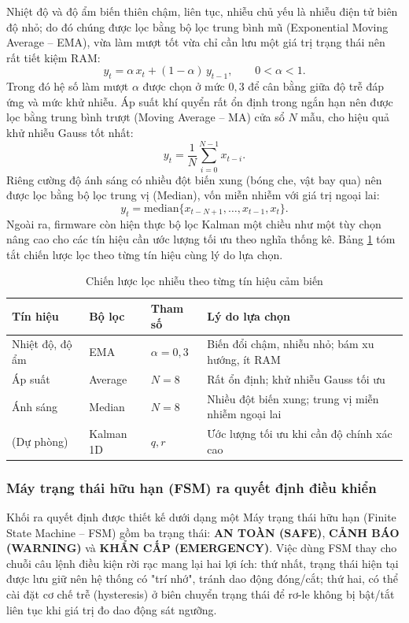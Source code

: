Nhiệt độ và độ ẩm biến thiên chậm, liên tục, nhiễu chủ yếu là nhiễu điện tử biên độ nhỏ; do đó chúng được lọc bằng bộ lọc trung bình mũ (Exponential Moving Average -- EMA), vừa làm mượt tốt vừa chỉ cần lưu một giá trị trạng thái nên rất tiết kiệm RAM:
\begin{equation}
    {y_t = \alpha \, x_t + (1-\alpha)\, y_{t-1}, \qquad 0 < \alpha < 1}.
\end{equation}
Trong đó hệ số làm mượt $\alpha$ được chọn ở mức $0{,}3$ để cân bằng giữa độ trễ đáp ứng và mức khử nhiễu. Áp suất khí quyển rất ổn định trong ngắn hạn nên được lọc bằng trung bình trượt (Moving Average -- MA) cửa sổ $N$ mẫu, cho hiệu quả khử nhiễu Gauss tốt nhất:
\begin{equation}
    {y_t = \frac{1}{N}\sum_{i=0}^{N-1} x_{t-i}}.
\end{equation}
Riêng cường độ ánh sáng có nhiều đột biến xung (bóng che, vật bay qua) nên được lọc bằng bộ lọc trung vị (Median), vốn miễn nhiễm với giá trị ngoại lai:
\begin{equation}
    {y_t = \mathrm{median}\{x_{t-N+1}, \dots, x_{t-1}, x_t\}}.
\end{equation}
Ngoài ra, firmware còn hiện thực bộ lọc Kalman một chiều \cite{kalman1960new} như một tùy chọn nâng cao cho các tín hiệu cần ước lượng tối ưu theo nghĩa thống kê. Bảng \ref{Bảng 3.5} tóm tắt chiến lược lọc theo từng tín hiệu cùng lý do lựa chọn.

\begin{table}[H]
\centering
\caption{Chiến lược lọc nhiễu theo từng tín hiệu cảm biến}
\label{Bảng 3.5}
\renewcommand{\arraystretch}{1.4}
\begin{tabular}{p{2.9cm} p{2.7cm} p{2.0cm} p{6.9cm}}
\hline
\textbf{Tín hiệu} & \textbf{Bộ lọc} & \textbf{Tham số} & \textbf{Lý do lựa chọn} \\ \hline
Nhiệt độ, độ ẩm & EMA & $\alpha = 0{,}3$ & Biến đổi chậm, nhiễu nhỏ; bám xu hướng, ít RAM \\ 
Áp suất & Average & $N = 8$ & Rất ổn định; khử nhiễu Gauss tối ưu \\ 
Ánh sáng & Median & $N = 8$ & Nhiều đột biến xung; trung vị miễn nhiễm ngoại lai \\ 
(Dự phòng) & Kalman 1D & $q, r$ & Ước lượng tối ưu khi cần độ chính xác cao \\ \hline
\end{tabular}
\end{table}

\subsubsection{Máy trạng thái hữu hạn (FSM) ra quyết định điều khiển}
Khối ra quyết định được thiết kế dưới dạng một Máy trạng thái hữu hạn (Finite State Machine -- FSM) gồm ba trạng thái: \textbf{AN TOÀN (SAFE)}, \textbf{CẢNH BÁO (WARNING)} và \textbf{KHẨN CẤP (EMERGENCY)}. Việc dùng FSM thay cho chuỗi câu lệnh điều kiện rời rạc mang lại hai lợi ích: thứ nhất, trạng thái hiện tại được lưu giữ nên hệ thống có "trí nhớ", tránh dao động đóng/cắt; thứ hai, có thể cài đặt cơ chế trễ (hysteresis) ở biên chuyển trạng thái để rơ-le không bị bật/tắt liên tục khi giá trị đo dao động sát ngưỡng.

